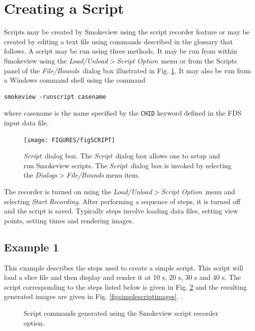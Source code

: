 \documentclass[11pt,twoside]{book}
\begin{document}
\section{Creating a Script}
Scripts may be created by Smokeview using the script recorder
feature or may be created by editing a text file using commands
described in the glossary that follows. A script may be run using
three methods.  It may be run from within Smokeview using the {\em
Load/Unload$>$Script Option}\ menu or from the Scripts panel of
the {\em File/Bounds}\ dialog box illustrated in Fig.
\ref{figSCRIPT}. It may also be run from a Windows command shell
using the command

\begin{lstlisting}
smokeview -runscript casename
\end{lstlisting}

\noindent where casename is the name specified by the {\tt CHID}
keyword defined in the FDS input data file.

\begin{figure}[\figoptions]
\centerline{
\texttt{[image: FIGURES/figSCRIPT]}
} \caption[{\em Script}\ dialog box.]{{\em Script}\ dialog box.
The {\em Script}\ dialog box allows one to setup and run Smokeview
scripts. The {\em Script}\ dialog box is invoked by selecting the
{\em Dialogs$>$File/Bounds} menu item. } \label{figSCRIPT}
\end{figure}

The recorder is turned on using the
{\em Load/Unload$>$Script Option}\ menu and selecting {\em Start Recording}.
After performing a sequence of steps, it is turned off and the
script is saved. Typically steps involve loading data files,
setting view points, setting times and rendering images.

\subsection{Example 1}

This example describes the steps used to create a simple script.  This script
will load a slice file and then display and render it at 10 s, 20 s, 30 s and 40 s.
The script corresponding to the steps listed below is given
in Fig. \ref{figsimplescripttext} and the resulting generated images are given
in Fig. \ref{figsimplescriptimages}.
.
\begin{figure}[\figoptions]
\caption{Script commands generated using the Smokeview script recorder option.}
\label{figsimplescripttext}%
\end{figure}
\end{document}
